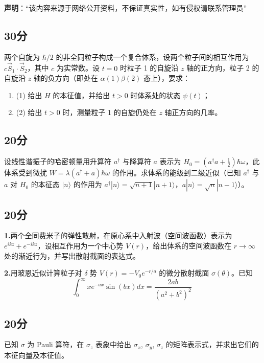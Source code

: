 
\textbf{声明}：“该内容来源于网络公开资料，不保证真实性，如有侵权请联系管理员”

\subsection{30分}
两个自旋为 $\hbar/2$ 的非全同粒子构成一个复合体系，设两个粒子间的相互作用为 $c\vec{S}_1 \cdot \vec{S}_2$，其中 $c$ 为实常数。设 $t=0$ 时粒子 1 的自旋沿 $z$ 轴的正方向，粒子 2 的自旋沿 $z$ 轴的负方向（即处在 $\alpha(1)\beta(2)$ 态上），要求：

\begin{enumerate}
    \item (1) 给出 $H$ 的本征值，并给出 $t > 0$ 时体系处的状态 $\psi(t)$；
    \item (2) 给出 $t > 0$ 时，测量粒子 1 的自旋仍处在 $z$ 轴正方向的几率。
\end{enumerate}
\subsection{20分}
设线性谐振子的哈密顿量用升算符 $a^\dagger$ 与降算符 $a$ 表示为 $H_0 = \left(a^\dagger a + \frac{1}{2}\right)\hbar\omega$，此体系受到微扰 $W = \lambda(a^\dagger + a)\hbar\omega$ 的作用。求体系的能级到二级近似（已知 $a^\dagger$ 与 $a$ 对 $H_0$ 的本征态 $|n\rangle$ 的作用为 $a^\dagger|n\rangle = \sqrt{n+1}|n+1\rangle$，$a|n\rangle = \sqrt{n}|n-1\rangle$）。
\subsection{20分}
\textbf{1.}两个全同费米子的弹性散射，在原心系中入射波（空间波函数）表示为 $e^{ikz} + e^{-ikz}$，设相互作用为一个中心势 $V(r)$，给出体系的空间波函数在 $r \to \infty$ 处的渐近行为，并写出散射截面的表达式。

\textbf{2.}用玻恩近似计算粒子对 $\delta$ 势 $V(r) = -V_0 e^{-r/a}$ 的微分散射截面 $\sigma(\theta)$。已知
$$\int_{0}^{\infty} x e^{-ax} \sin(bx) dx = \frac{2ab}{(a^2 + b^2)^2}~$$
\subsection{20分}
已知 $\sigma$ 为 Pauli 算符，在 $ \sigma_z$ 表象中给出 $\sigma_x$, $\sigma_y$, $\sigma_z$ 的矩阵表示式，并求出它们的本征向量及本征值。

